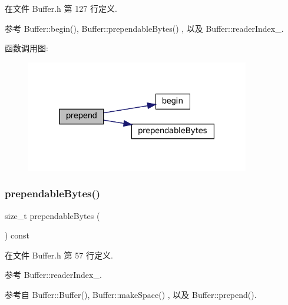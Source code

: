 在文件 Buffer.\+h 第 127 行定义.



参考 Buffer\+::begin(), Buffer\+::prependable\+Bytes() , 以及 Buffer\+::reader\+Index\+\_\+.

函数调用图\+:
\nopagebreak
\begin{figure}[H]
\begin{center}
\leavevmode
\includegraphics[width=277pt]{classmuduo_1_1Buffer_a3099092e4d4138f55fb825a50f50f24b_cgraph}
\end{center}
\end{figure}
\mbox{\label{classmuduo_1_1Buffer_ad738bbd8321f518ca5cdfac842993d04}} 
\subsubsection{\texorpdfstring{prependable\+Bytes()}{prependableBytes()}}
{\footnotesize\ttfamily size\+\_\+t prependable\+Bytes (\begin{DoxyParamCaption}{ }\end{DoxyParamCaption}) const\hspace{0.3cm}{\ttfamily [inline]}}



在文件 Buffer.\+h 第 57 行定义.



参考 Buffer\+::reader\+Index\+\_\+.



参考自 Buffer\+::\+Buffer(), Buffer\+::make\+Space() , 以及 Buffer\+::prepend().

